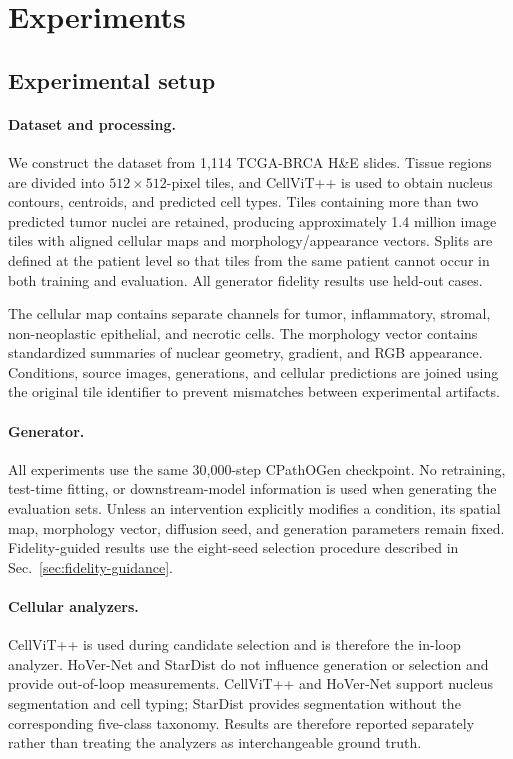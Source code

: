 \section{Experiments}
\label{sec:experiments}

\subsection{Experimental setup}
\label{sec:experimental-setup}

\paragraph{Dataset and processing.}
We construct the dataset from 1,114 TCGA-BRCA H\&E slides. Tissue regions are divided into $512\times512$-pixel tiles, and CellViT++ is used to obtain nucleus contours, centroids, and predicted cell types. Tiles containing more than two predicted tumor nuclei are retained, producing approximately 1.4 million image tiles with aligned cellular maps and morphology/appearance vectors. Splits are defined at the patient level so that tiles from the same patient cannot occur in both training and evaluation. All generator fidelity results use held-out cases.

The cellular map contains separate channels for tumor, inflammatory, stromal, non-neoplastic epithelial, and necrotic cells. The morphology vector contains standardized summaries of nuclear geometry, gradient, and RGB appearance. Conditions, source images, generations, and cellular predictions are joined using the original tile identifier to prevent mismatches between experimental artifacts.

\paragraph{Generator.}
All experiments use the same 30,000-step CPathOGen checkpoint. No retraining, test-time fitting, or downstream-model information is used when generating the evaluation sets. Unless an intervention explicitly modifies a condition, its spatial map, morphology vector, diffusion seed, and generation parameters remain fixed. Fidelity-guided results use the eight-seed selection procedure described in Sec.~\ref{sec:fidelity-guidance}.

\paragraph{Cellular analyzers.}
CellViT++ is used during candidate selection and is therefore the in-loop analyzer. HoVer-Net and StarDist do not influence generation or selection and provide out-of-loop measurements. CellViT++ and HoVer-Net support nucleus segmentation and cell typing; StarDist provides segmentation without the corresponding five-class taxonomy. Results are therefore reported separately rather than treating the analyzers as interchangeable ground truth.

